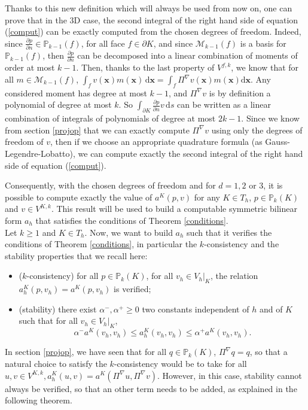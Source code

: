 Thanks to this new definition which will always be used from now on, one can prove that in the $3$D case, the second integral of the right hand side of equation (\ref{comput}) can be exactly computed from the chosen degrees of freedom. Indeed, since $\frac{\partial p}{\partial n}\in \mathbb{P}_{k-1}(f)$, for all face $f\in \partial K$, and since $\mathcal{M}_{k-1}(f)$ is a basis for $\mathbb{P}_{k-1}(f)$, then $\frac{\partial p}{\partial n}$ can be decomposed into a linear combination of moments of order at most $k-1$. Then, thanks to the last property of $V^{f,k}$, we know that for all $m\in\mathcal{M}_{k-1}(f)$, $\int_{f} v(\mathbf{x}) m(\mathbf{x}) \, \mathrm{d}\mathbf{x} = \int_{f} \Pi^\nabla v(\mathbf{x}) m(\mathbf{x})\mathrm{d}\mathbf{x}$. Any considered moment has degree at most $k-1$, and $\Pi^\nabla v$ is by definition a polynomial of degree at most $k$. So $\int_{\partial K} \frac{\partial p}{\partial n}v \, \mathrm{d}s$ can be written as a linear combination of integrals of polynomials of degree at most $2k-1$. Since we know from section \ref{projop} that we can exactly compute $\Pi^\nabla v$  using only the degrees of freedom of $v$, then if we choose an appropriate quadrature formula (as Gauss-Legendre-Lobatto), we can compute exactly the second integral of the right hand side of equation (\ref{comput}). 

Consequently, with the chosen degrees of freedom and for $d=1,2$ or $3$, it is possible to compute exactly the value of $a^K(p,v)$ for any $K\in T_h$, $p\in \mathbb{P}_k(K)$ and $v\in V^{K,k}$. This result will be used to build a computable symmetric bilinear form $a_h$ that satisfies the conditions of Theorem \ref{conditions}. \\

Let $k\geq 1$ and $K\in T_h$. Now, we want to build $a_h$ such that it verifies the conditions of Theorem \ref{conditions}, in particular the $k$-consistency and the stability properties that we recall here: 
\begin{itemize}
\item($k$-consistency) for all $p\in \mathbb{P}_k(K)$, for all $v_h\in V_h|_K$, the relation $a_h^K(p, v_h) = a^K(p, v_h)$ is verified;
\item (stability) there exist $\alpha^-, \alpha^+ \geq 0$ two constants independent of $h$ and of $K$ such that for all $v_h\in V_h|_K$,
$$ \alpha^-a^K(v_h,v_h)\leq a_h^K(v_h,v_h)\leq \alpha^+a^K(v_h,v_h).$$
\end{itemize}

In section \ref{projop}, we have seen that for all $q\in \mathbb{P}_k(K)$, $\Pi^\nabla q = q$, so that a natural choice to satisfy the $k$-consistency would be to take for all $u,v\in V^{K,k}, a_h^K(u,v) = a^K(\Pi^\nabla u, \Pi^\nabla v)$. However, in this case, stability cannot always be verified, so that an other term needs to be added, as explained in the following theorem. 

